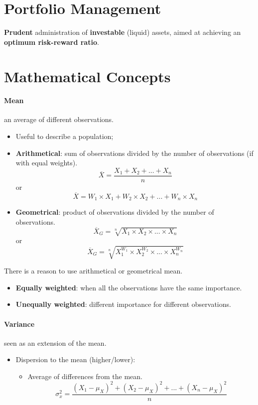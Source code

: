 \documentclass[11pt,a4paper]{report}
\begin{document}
\section{Portfolio Management}
\textbf{Prudent} administration of \textbf{investable} (liquid) assets, aimed at achieving an \textbf{optimum risk-reward ratio}.
\section{Mathematical Concepts}
\paragraph{Mean} an average of different observations.
\begin{itemize}
    \item Useful to describe a population;
    \item \textbf{Arithmetical}: sum of observations divided by the number of observations (if with equal weights).
    \[\overline{X} = \frac{X_1 + X_2 + ... + X_n}{n}\]
    or
    \[\overline{X} = W_1 \times X_1 + W_2 \times X_2 + ... + W_n \times X_n\]
    \item \textbf{Geometrical}: product of observations divided by the number of observations.
    \[\overline{X}_G = \sqrt[n]{X_1 \times X_2 \times ... \times X_n}\]
    or
    \[\overline{X}_G = \sqrt[n]{X_1^{W_1} \times X_2^{W_2} \times ... \times X_n^{W_n}} \]
\end{itemize}
There is a reason to use arithmetical or geometrical mean.
\begin{itemize}
    \item \textbf{Equally weighted}: when all the observations have the same importance.
    \item \textbf{Unequally weighted}: different importance for different observations.
\end{itemize}

\paragraph{Variance} seen as an extension of the mean.
\begin{itemize}
    \item Dispersion to the mean (higher/lower):
    \begin{itemize}
        \item Average of differences from the mean.
        \[\sigma_x^2 = \frac{(X_1 - \mu_X)^2 + (X_2 - \mu_X)^2 + ... + (X_n - \mu_X)^2}{n}\]
    \end{itemize}
    
\end{itemize}
\end{document}
